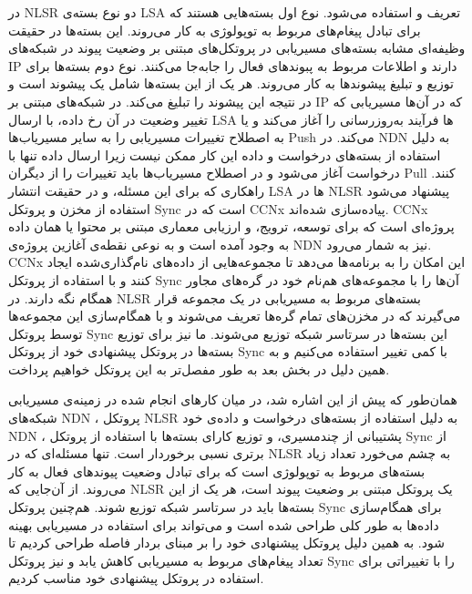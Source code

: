 در NLSR دو نوع بسته‌ی LSA تعریف و استفاده می‌شود. نوع اول بسته‌هایی هستند که برای تبادل پیغام‌های مربوط به توپولوژی به کار می‌روند. این بسته‌ها در حقیقت وظیفه‌ای مشابه بسته‌های مسیریابی در پروتکل‌های مبتنی بر وضعیت پیوند در شبکه‌های IP دارند و اطلاعات مربوط به پبوند‌های فعال را جابه‌جا می‌کنند. نوع دوم بسته‌ها برای توزیع و تبلیغ پیشوند‌ها به کار می‌روند. هر یک از این بسته‌ها شامل یک پیشوند است و در نتیجه این پیشوند را تبلیغ می‌کند. در شبکه‌های مبتنی بر IP که در آن‌ها مسیریابی که تغییر وضعیت در آن رخ داده، با ارسال LSA ها فرآیند به‌روزرسانی را آغاز می‌کند و یا به اصطلاح تغییرات مسیریابی را به سایر مسیریاب‌ها Push می‌کند. در NDN به دلیل استفاده از بسته‌های درخواست و داده این کار ممکن نیست زیرا ارسال داده‌ تنها با درخواست آغاز می‌شود و در اصطلاح مسیریاب‌ها باید تغییرات را از دیگران Pull کنند. راهکاری که برای این مسئله، و در حقیقت انتشار LSA ها در NLSR پیشنهاد می‌شود استفاده از مخزن  و پروتکل Sync است که در CCNx 
 \cite{ccnx}
 پیاده‌سازی شده‌اند. CCNx پروژه‌ای است که برای توسعه، ترویج، و ارزیابی معماری مبتنی بر محتوا یا همان داده به وجود آمده است و به نوعی نقطه‌ی آغازین پروژه‌ی NDN نیز به شمار می‌رود. CCNx این امکان را به برنامه‌ها می‌دهد تا مجموعه‌هایی از داده‌های نام‌گذاری‌شده ایجاد کنند و با استفاده از پروتکل Sync آن‌ها را با مجموعه‌های هم‌نام خود در گره‌های مجاور همگام نگه دارند. در NLSR بسته‌های مربوط به مسیریابی در یک مجموعه قرار می‌گیرند که در مخزن‌های تمام گره‌ها تعریف می‌شوند و با همگام‌سازی این مجموعه‌ها توسط پروتکل Sync این بسته‌ها در سرتاسر شبکه توزیع می‌شوند. ما نیز برای توزیع بسته‌ها در پروتکل پیشنهادی خود از پروتکل Sync با کمی تغییر استفاده می‌کنیم و به همین دلیل در بخش بعد به طور مفصل‌تر به این پروتکل خواهیم پرداخت.

همان‌طور که پیش از این اشاره شد، در میان کارهای انجام شده در زمینه‌ی مسیریابی شبکه‌های NDN ، پروتکل NLSR به دلیل استفاده از بسته‌های درخواست و داده‌ی خود NDN ، پشتیبانی از چندمسیری، و توزیع کارای بسته‌ها با استفاده از پروتکل Sync از برتری نسبی برخوردار است. تنها مسئله‌ای که در NLSR به چشم می‌خورد تعداد زیاد بسته‌های مربوط به توپولوژی است که برای تبادل وضعیت پیوندهای فعال به کار می‌روند. از آن‌جایی که NLSR یک پروتکل مبتنی بر وضعیت پیوند است، هر یک از این بسته‌ها باید در سرتاسر شبکه توزیع شوند. هم‌چنین پروتکل Sync برای همگام‌سازی داده‌ها به طور کلی طراحی شده است و می‌تواند برای استفاده در مسیریابی بهینه شود. به همین دلیل پروتکل پیشنهادی خود را بر مبنای بردار فاصله طراحی کردیم تا تعداد پیغام‌های مربوط به مسیریابی کاهش یابد و نیز پروتکل Sync  را با تغییراتی برای استفاده در پروتکل پیشنهادی خود مناسب کردیم. 





